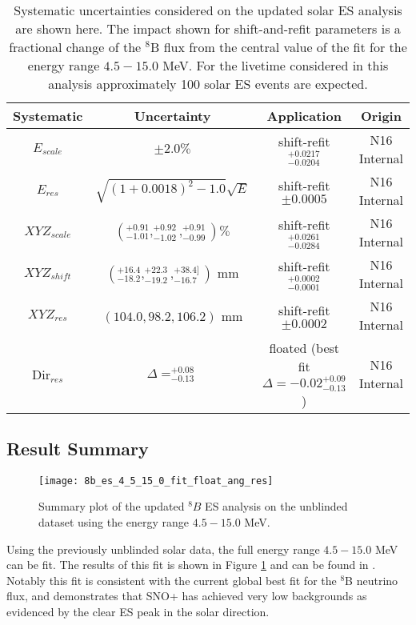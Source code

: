 \begin{table}[]
\begin{center}
\begin{tabular}{c|c|c|c}
Systematic & Uncertainty & Application & Origin \\ \hline
$E_{scale}$     & $\pm 2.0\%$ & shift-refit $^{+0.0217}_{-0.0204}$ & N16 Internal \rule{0pt}{2.6ex}\rule[-1.2ex]{0pt}{0pt}  \\
$E_{res}$       & $\sqrt{(1+0.0018)^2-1.0}\sqrt{E}$ & shift-refit $\pm 0.0005$ & N16 Internal  \rule{0pt}{2.6ex}\rule[-1.2ex]{0pt}{0pt}  \\
${XYZ}_{scale}$ & $(^{+0.91}_{-1.01},^{+0.92}_{-1.02},^{+0.91}_{-0.99}) \%$ & shift-refit $^{+0.0261}_{-0.0284}$ & N16 Internal  \rule{0pt}{2.6ex}\rule[-1.2ex]{0pt}{0pt}  \\
${XYZ}_{shift}$ & $(^{+16.4}_{-18.2},^{+22.3}_{-19.2},^{+38.4]}_{-16.7})$ mm & shift-refit $^{+0.0002}_{-0.0001}$ & N16 Internal  \rule{0pt}{2.6ex}\rule[-1.2ex]{0pt}{0pt}  \\
${XYZ}_{res}$ & $(104.0,98.2,106.2)$ mm & shift-refit $\pm 0.0002$ & N16 Internal  \rule{0pt}{2.6ex}\rule[-1.2ex]{0pt}{0pt}  \\
Dir$_{res}$     &  $\Delta = ^{+0.08}_{-0.13}$ & floated (best fit $\Delta = -0.02^{+0.09}_{-0.13}$) & N16 Internal \rule{0pt}{2.6ex}\rule[-1.2ex]{0pt}{0pt}  \\ \hline
\end{tabular}
\caption{ Systematic uncertainties considered on the updated solar ES analysis are shown here. 
The impact shown for shift-and-refit parameters is a fractional change of the $^8$B flux from the central value of the fit for the energy range $4.5-15.0$ MeV.
For the livetime considered in this analysis approximately 100 solar ES events are expected.}
\label{tbl:solar:updated_syst}
\end{center}
\end{table}


\subsection{Result Summary}

\begin{figure}
\centering
\texttt{[image: 8b\_es\_4\_5\_15\_0\_fit\_float\_ang\_res]}
\caption{Summary plot of the updated $^8B$ ES analysis on the unblinded dataset using the energy range $4.5-15.0$ MeV.}
\label{fig:solar:unpdated_fit_4.5}
\end{figure}

Using the previously unblinded solar data, the full energy range $4.5-15.0$ MeV can be fit. 
The results of this fit is shown in Figure \ref{fig:solar:unpdated_fit_4.5} and can be found in \cite{snoplus_solar}.
Notably this fit is consistent with the current global best fit for the $^8$B neutrino flux, and demonstrates that SNO+ has achieved very low backgrounds as evidenced by the clear ES peak in the solar direction.
